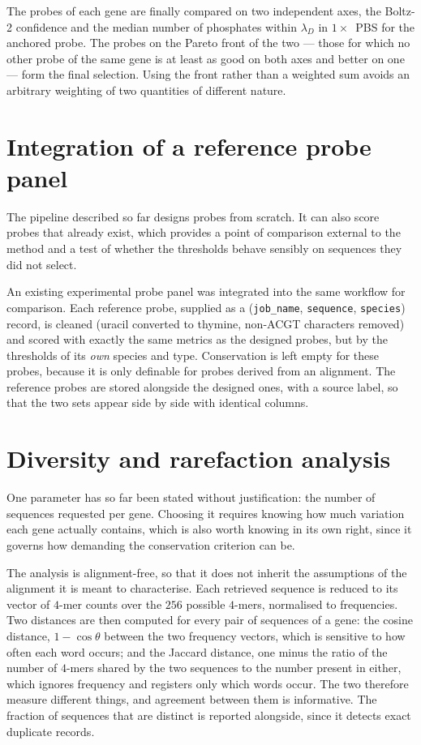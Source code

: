 The probes of each gene are finally compared on two independent axes, the Boltz-2 confidence and the
median number of phosphates within $\lambda_D$ in $1\times$~PBS for the anchored probe. The probes on the
Pareto front of the two --- those for which no other probe of the same gene is at least as good on both
axes and better on one --- form the final selection. Using the front rather than a weighted sum avoids an
arbitrary weighting of two quantities of different nature.

\section{Integration of a reference probe panel}

The pipeline described so far designs probes from scratch. It can also score probes that already
exist, which provides a point of comparison external to the method and a test of whether the
thresholds behave sensibly on sequences they did not select.

An existing experimental probe panel was integrated into the same workflow for comparison. Each reference
probe, supplied as a (\texttt{job\_name}, \texttt{sequence}, \texttt{species}) record, is cleaned (uracil
converted to thymine, non-ACGT characters removed) and scored with exactly the same metrics as the designed
probes, but by the thresholds of its \emph{own} species and type. Conservation is left empty for these
probes, because it is only definable for probes derived from an alignment. The reference probes are stored
alongside the designed ones, with a source label, so that the two sets appear side by side with identical
columns.

\section{Diversity and rarefaction analysis}
\label{sec:diversity}

One parameter has so far been stated without justification: the number of sequences requested per
gene. Choosing it requires knowing how much variation each gene actually contains, which is also
worth knowing in its own right, since it governs how demanding the conservation criterion can be.

The analysis is alignment-free, so that it does not inherit the assumptions of the alignment it is
meant to characterise. Each retrieved sequence is reduced to its vector of $4$-mer counts over the
$256$ possible $4$-mers, normalised to frequencies. Two distances are then computed for every pair
of sequences of a gene: the cosine distance, $1 - \cos\theta$ between the two frequency vectors,
which is sensitive to how often each word occurs; and the Jaccard distance, one minus the ratio of
the number of $4$-mers shared by the two sequences to the number present in either, which ignores
frequency and registers only which words occur. The two therefore measure different things, and
agreement between them is informative. The fraction of sequences that are distinct is reported
alongside, since it detects exact duplicate records.

